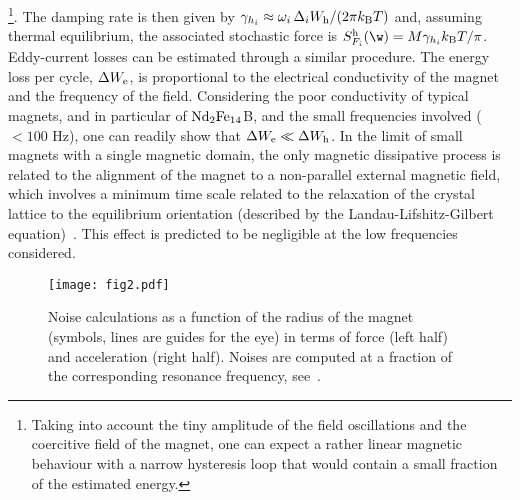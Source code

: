 \documentclass[twocolumn,superscriptaddress,floatfix,preprintnumbers,prl]{revtex4}
\begin{document}
\footnote{Taking into account the tiny amplitude of the field oscillations and the coercitive field of the magnet, one can expect a rather linear magnetic behaviour with a narrow hysteresis loop that would contain a small fraction of the estimated energy.}.
The damping rate is then given by $\gamma_{h_i}\approx\omega_i \, \Delta_i W_{\rm h}/(2\pi k_{\rm B} T)$ and, assuming thermal equilibrium, the associated stochastic force is $S_{F_i}^{\rm h}(\w) = M \gamma_{h_i}  k_{\rm B} T/\pi$.
Eddy-current losses can be estimated through a similar procedure. The energy loss per cycle, $\Delta W_{\rm e}$, is proportional to the electrical conductivity of the magnet and the frequency of the field. Considering the poor conductivity of typical magnets, and in particular of ${\rm Nd}_2{\rm Fe}_{14}$B, and the small frequencies involved ($<100$ Hz), one can readily show that $\Delta W_{\rm e}\ll \Delta W_{\rm h}$. 
In the limit of small magnets with a single magnetic domain, the only magnetic dissipative process is related to the alignment of the magnet to a non-parallel external magnetic field, which involves a minimum time scale related to the relaxation of the crystal lattice to the equilibrium orientation (described by the Landau-Lifshitz-Gilbert equation)~\cite{landau35,gilbert2004}. This effect is predicted to be negligible at the low frequencies considered.

\begin{figure}[t]
\begin{center}
\texttt{[image: fig2.pdf]}
\caption{Noise calculations as a function of the radius of the magnet (symbols, lines are guides for the eye) in terms of force (left half) and acceleration (right half). Noises are computed at a fraction of the corresponding resonance frequency, see~\cite{SM}.}
\label{fig.2}
\end{center}
\end{figure}
\end{document}
